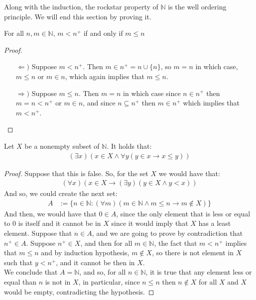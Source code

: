 \documentclass{tufte-handout}
\begin{document}
Along with the induction, the rockstar property of $\mathbb{N}$ is the well ordering principle. We will end this section by proving it.

\begin{lemma}
	For all $n, m \in \mathbb{N}$, $m < n^+$ if and only if $m \le n$
\end{lemma}
\begin{proof}
	\begin{itemize}
		\item[$\Leftarrow)$] Suppose $m < n^+$. Then $m \in n^+ = n \cup \{n\}$, so $m = n$ in which case, $m \le n$ or $m \in n$, which again implies that $m \le n$.
		\item[$\Rightarrow)$] Suppose $m \le n$. Then $m = n$ in which case since $n \in n^+$ then $m = n < n^+$ or $m \in n$, and since $n \subseteq n^+$ then $m \in n^+$ which implies that $m < n^+$. 
	\end{itemize}
\end{proof}

\begin{theorem}
	Let $X$ be a nonempty subset of $\mathbb{N}$. It holds that:
	\begin{align*}
		(\exists x)(x \in X \wedge \forall y(y \in x \rightarrow x \le y))
	\end{align*}
\end{theorem}
\begin{proof}
	Suppose that this is false. So, for the set $X$ we would have that:
	\begin{align*}
		(\forall x)(x \in X \rightarrow (\exists y)(y \in X \wedge y < x))
	\end{align*}
	And so, we could create the next set:
	\begin{align*}
		A &:= \{n \in \mathbb{N}: (\forall m)(m \in \mathbb{N} \wedge m \le n \rightarrow m \not \in X)\}
	\end{align*}
	And then, we would have that $0 \in A$, since the only element that is less or equal to $0$ is itself and it cannot be in $X$ since it would imply that $X$ has a least element. Suppose that $n \in A$, and we are going to prove by contradiction that $n^+ \in A$. Suppose $n^+ \in X$, and then for all $m \in \mathbb{N}$, the fact that $m < n^+$ implies that $m \le n$ and by induction hypothesis, $m \not \in X$, so there is not element in $X$ such that $y < n^+$, and it cannot be then in $X$.\\

	We conclude that $A = \mathbb{N}$, and so, for all $n \in \mathbb{N}$, it is true that any element less or equal than $n$ is not in $X$, in particular, since $n \le n$ then $n \not \in X$ for all $X$ and $X$ would be empty, contradicting the hypothesis.
\end{proof}
\end{document}
